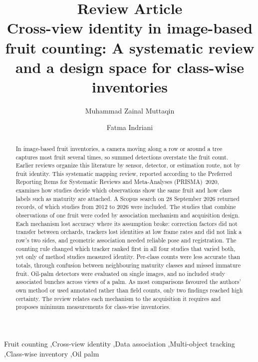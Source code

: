 \documentclass[a4paper,fleqn]{cas-dc}
\begin{document}
\title[mode=title]{{\normalsize Review Article}\\[3pt] Cross-view identity in image-based fruit counting: A systematic review and a design space for class-wise inventories}
\author[1]{Muhammad Zainal Muttaqin}
\author[1]{Fatma Indriani}
\cormark[1]
\begin{abstract}
In image-based fruit inventories, a camera moving along a row or around a tree captures most fruit several times, so summed detections overstate the fruit count. Earlier reviews organize this literature by sensor, detector, or estimation route, not by fruit identity. This systematic mapping review, reported according to the Preferred Reporting Items for Systematic Reviews and Meta-Analyses (PRISMA)~2020, examines how studies decide which observations show the same fruit and how class labels such as maturity are attached. A Scopus search on 28 September 2026 returned \nRetrieved records, of which \nIncluded studies from 2012 to 2026 were included. The \nMulti studies that combine observations of one fruit were coded by association mechanism and acquisition design. Each mechanism lost accuracy where its assumption broke: correction factors did not transfer between orchards, trackers lost identities at low frame rates and did not link a row's two sides, and geometric association needed reliable pose and registration. The counting rule changed which tracker ranked first in all four studies that varied both, yet only \nMetIdent of \nMethodMetric method studies measured identity. Per-class counts were less accurate than totals, through confusion between neighbouring maturity classes and missed immature fruit. Oil-palm detectors were evaluated on single images, and no included study associated bunches across views of a palm. As most comparisons favoured the authors' own method or used annotated rather than field counts, only two findings reached high certainty. The review relates each mechanism to the acquisition it requires and proposes minimum measurements for class-wise inventories.
\end{abstract}
\begin{keywords}
Fruit counting \sep Cross-view identity \sep Data association \sep Multi-object tracking \sep Class-wise inventory \sep Oil palm
\end{keywords}
\maketitle



\clearpage
\onecolumn
\appendix
\renewcommand{\thetable}{A\arabic{table}}
\setcounter{table}{0}
\end{document}
